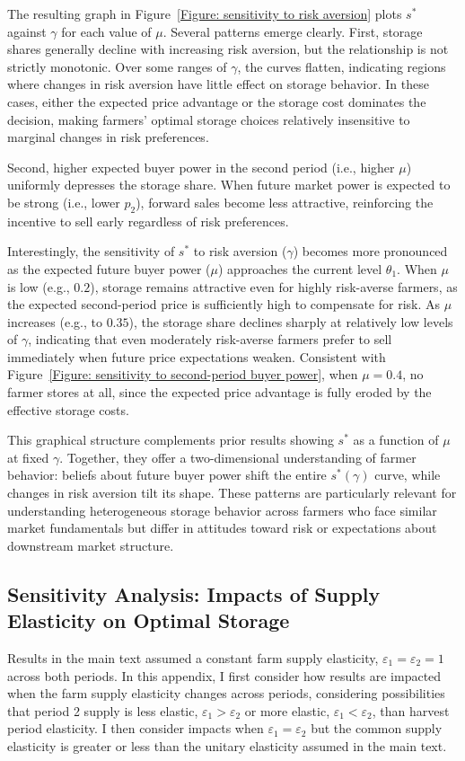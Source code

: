 The resulting graph in Figure~\ref{Figure: sensitivity to risk aversion} plots $s^*$ against $\gamma$ for each value of $\mu$. Several patterns emerge clearly. First, storage shares generally decline with increasing risk aversion, but the relationship is not strictly monotonic. Over some ranges of $\gamma$, the curves flatten, indicating regions where changes in risk aversion have little effect on storage behavior. In these cases, either the expected price advantage or the storage cost dominates the decision, making farmers' optimal storage choices relatively insensitive to marginal changes in risk preferences. 

Second, higher expected buyer power in the second period (i.e., higher $\mu$) uniformly depresses the storage share. When future market power is expected to be strong (i.e., lower $p_2$), forward sales become less attractive, reinforcing the incentive to sell early regardless of risk preferences.

Interestingly, the sensitivity of $s^*$ to risk aversion ($\gamma$) becomes more pronounced as the expected future buyer power ($\mu$) approaches the current level $\theta_1$. When $\mu$ is low (e.g., $0.2$), storage remains attractive even for highly risk-averse farmers, as the expected second-period price is sufficiently high to compensate for risk. As $\mu$ increases (e.g., to $0.35$), the storage share declines sharply at relatively low levels of $\gamma$, indicating that even moderately risk-averse farmers prefer to sell immediately when future price expectations weaken. Consistent with Figure~\ref{Figure: sensitivity to second-period buyer power}, when $\mu = 0.4$, no farmer stores at all, since the expected price advantage is fully eroded by the effective storage costs.


This graphical structure complements prior results showing $s^*$ as a function of $\mu$ at fixed $\gamma$. Together, they offer a two-dimensional understanding of farmer behavior: beliefs about future buyer power shift the entire $s^*(\gamma)$ curve, while changes in risk aversion tilt its shape. These patterns are particularly relevant for understanding heterogeneous storage behavior across farmers who face similar market fundamentals but differ in attitudes toward risk or expectations about downstream market structure.



\subsection{Sensitivity Analysis: Impacts of Supply Elasticity on Optimal Storage}
\noindent Results in the main text assumed a constant farm supply elasticity, $\varepsilon_1 = \varepsilon_2 = 1$ across both periods. In this appendix, I first consider how results are impacted when the farm supply elasticity changes across periods, considering possibilities that period 2 supply is less elastic, $\varepsilon_1 > \varepsilon_2$ or more elastic, $\varepsilon_1 < \varepsilon_2$, than harvest period elasticity. I then consider impacts when $\varepsilon_1 = \varepsilon_2$ but the common supply elasticity is greater or less than the unitary elasticity assumed in the main text.



